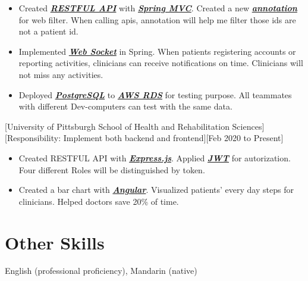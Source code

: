 \documentclass{article}
\begin{document}
\begin{itemize}
\item Created \textbf{\textit{\underline{RESTFUL API}}} with \textbf{\textit{\underline{Spring MVC}}}. Created a new \textbf{\textit{\underline{annotation}}} for web filter. When calling apis, annotation will help me filter those ids are not a patient id.

\item Implemented \textbf{\textit{\underline{Web Socket}}} in Spring. When patients registering accounts or reporting activities, clinicians can receive notifications on time. Clinicians will not miss any activities. 

\item Deployed \textbf{\textit{\underline{PostgreSQL}}} to \textbf{\textit{\underline{AWS RDS}}} for testing purpose. All teammates with different Dev-computers can test with the same data.
\end{itemize}

[University of Pittsburgh School of Health and Rehabilitation Sciences]
[Responsibility: Implement both backend and frontend][Feb 2020 to Present]
\begin{itemize}
\item Created RESTFUL API with \textbf{\textit{\underline{Express.js}}}. Applied \textbf{\textit{\underline{JWT}}} for autorization. Four different Roles will be distinguished by token. 

\item Created a bar chart with \textbf{\textit{\underline{Angular}}}. Visualized patients' every day steps for clinicians. Helped doctors save 20\% of time.
\end{itemize}

\section{Other Skills}
\begin{description}[widest=Languages]
\item[Languages]	English (professional proficiency), Mandarin (native) 
\end{description}
\end{document}
